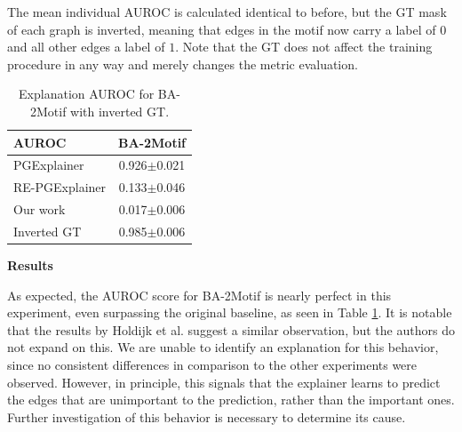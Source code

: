 The mean individual AUROC is calculated identical to before, but the \ac{GT} mask of each graph is inverted, meaning that edges in the motif now carry a label of $0$ and all other edges a label of $1$. 
Note that the \ac{GT} does not affect the training procedure in any way and merely changes the metric evaluation. \bigskip

\begin{table}[h]
    \centering
    \small
    \begin{tabular}{l|c}
    \textbf{AUROC} & BA-2Motif \\
    \hline
    PGExplainer       & 0.926$\pm$0.021 \\
    RE-PGExplainer       & 0.133$\pm$0.046 \\
    Our work       & 0.017$\pm$0.006 \\
    \hline
    Inverted GT     & 0.985$\pm$0.006 \\
    \end{tabular}
    \caption[Inductive performance on BA-2Motif with inverted ground truth]{Explanation AUROC for BA-2Motif with inverted GT.}
    \label{tab:flippedGT}
\end{table}

\textbf{Results} \par

As expected, the AUROC score for BA-2Motif is nearly perfect in this experiment, even surpassing the original baseline, as seen in Table \ref{tab:flippedGT}. It is notable that the results by Holdijk et al. \cite{holdijk2021re} suggest a similar observation, but the authors do not expand on this. We are unable to identify an explanation for this behavior, since no consistent differences in comparison to the other experiments were observed. However, in principle, this signals that the explainer learns to predict the edges that are unimportant to the prediction, rather than the important ones. Further investigation of this behavior is necessary to determine its cause. 


